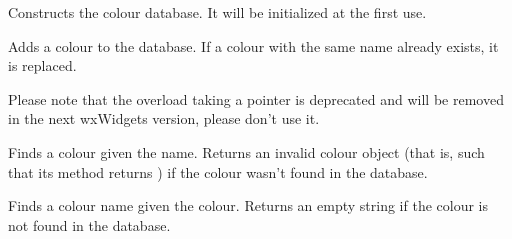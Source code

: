 



\label{wxcolourdatabaseconstr}


Constructs the colour database. It will be initialized at the first use.


\label{wxcolourdatabaseaddcolour}



Adds a colour to the database. If a colour with the same name already exists,
it is replaced.

Please note that the overload taking a pointer is deprecated and will be
removed in the next wxWidgets version, please don't use it.


\label{wxcolourdatabasefind}


Finds a colour given the name. Returns an invalid colour object (that is, such
that its  method returns \false) if the colour wasn't
found in the database.


\label{wxcolourdatabasefindname}


Finds a colour name given the colour. Returns an empty string if the colour is
not found in the database.


